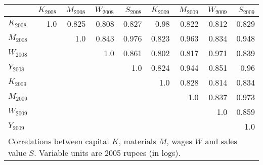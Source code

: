 \begin{tabular}{lrrrrrrrr}
\toprule
{} &  $K_{2008}$ &  $M_{2008}$ &  $W_{2008}$ &  $S_{2008}$ &  $K_{2009}$ &  $M_{2009}$ &  $W_{2009}$ &  $S_{2009}$ \\
\midrule
$K_{2008}$ &         1.0 &       0.825 &       0.808 &       0.827 &        0.98 &       0.822 &       0.812 &       0.829 \\
$M_{2008}$ &             &         1.0 &       0.843 &       0.976 &       0.823 &       0.963 &       0.834 &       0.948 \\
$W_{2008}$ &             &             &         1.0 &       0.861 &       0.802 &       0.817 &       0.971 &       0.839 \\
$Y_{2008}$ &             &             &             &         1.0 &       0.824 &       0.944 &       0.851 &        0.96 \\
$K_{2009}$ &             &             &             &        &         1.0 &       0.828 &       0.814 &       0.834 \\
$M_{2009}$ &             &             &             &        &             &         1.0 &       0.837 &       0.973 \\
$W_{2009}$ &             &             &             &        &              &            &         1.0 &       0.859 \\
$Y_{2009}$ &             &             &             &        &              &            &             &         1.0 \\
\bottomrule
\multicolumn{9}{p{.8\textwidth}}{{\scriptsize Correlations between capital $K$, materials $M$, wages $W$ and sales value $S$. Variable units are 2005 rupees (in logs).}}
\end{tabular}
